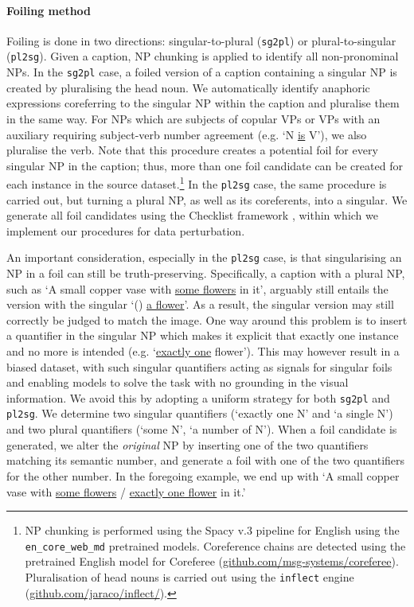 \documentclass[11pt]{article}
\newcommand{\gr}[1]{\textcolor{niceblue}{#1}}
\newcommand\red[1]{\textcolor{niceorange}{#1}}
\begin{document}
\paragraph{Foiling method} Foiling is done in two directions: singular-to-plural ({\tt sg2pl}) or plural-to-singular ({\tt pl2sg}). Given a caption, NP chunking is applied to identify all non-pronominal NPs. In the {\tt sg2pl} case, a foiled version of a caption containing a singular NP is created by pluralising the head noun.
We automatically identify anaphoric expressions coreferring to the singular NP within the caption and pluralise them in the same way.
For NPs which are subjects of copular VPs or VPs with an auxiliary requiring subject-verb number agreement (e.g. `N \underline{is} V'), we also pluralise the verb.
Note that this procedure creates a potential foil for every singular NP in the caption; thus, more than one foil candidate can be created for each instance in the source dataset.\footnote{NP chunking is performed using the Spacy v.3 pipeline for English using the {\tt en\_core\_web\_md} pretrained models. Coreference chains are detected using the pretrained English model for Coreferee (\url{github.com/msg-systems/coreferee}). Pluralisation of head nouns is carried out using the {\tt inflect} engine (\url{github.com/jaraco/inflect/}).}
In the {\tt pl2sg} case, the same procedure is carried out, but turning a plural NP, as well as its coreferents, into a singular. We generate all foil candidates using the Checklist framework \cite{ribeiro-etal-2020-beyond}, within which we implement our procedures for data perturbation.

An important consideration, especially in the {\tt pl2sg} case, is that singularising an NP in a foil can still be truth-preserving. Specifically, a caption with a plural NP, such as  `A small copper vase with \underline{some flowers} in it', arguably still entails the version with the singular `(\textellipsis) \underline{a flower}'. As a result, the singular version may still correctly be judged to match the image. One way around this problem is to insert a quantifier in the singular NP which makes it explicit that exactly one instance and no more is intended (e.g. `\underline{exactly one} flower'). This may however result in a biased dataset, with such singular quantifiers acting as signals for singular foils and enabling models to solve the task with no grounding in the visual information. We avoid this by adopting a uniform strategy for both {\tt sg2pl} and {\tt pl2sg}. We determine two singular quantifiers (`exactly one N' and `a single N') and two plural quantifiers (`some N', `a number of N'). When a foil candidate is generated, we alter the {\em original} NP by inserting one of the two quantifiers matching its semantic number, and generate a foil with one of the two quantifiers for the other number.
In the foregoing example, we end up with `A small copper vase with \underline{\gr{some flowers}} / \underline{\red{exactly one flower}} in it.'
\end{document}
